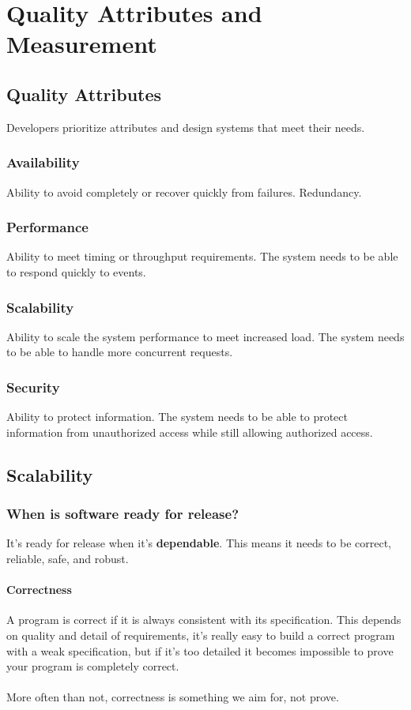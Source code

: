 \chapter{Quality Attributes and Measurement}
\section{Quality Attributes}
Developers prioritize attributes and design systems that meet their needs.\\
\subsection{Availability}
Ability to avoid completely or recover quickly from failures. Redundancy.
\subsection{Performance}
Ability to meet timing or throughput requirements. The system needs to be able to respond quickly to events.
\subsection{Scalability}
Ability to scale the system performance to meet increased load. The system needs to be able to handle more concurrent requests.
\subsection{Security}
Ability to protect information. The system needs to be able to protect information from unauthorized access while still allowing authorized access.

\section{Scalability}
\subsection{When is software ready for release?}
It's ready for release when it's \textbf{dependable}. This means it needs to be correct, reliable, safe, and robust.
\subsubsection{Correctness}
A program is correct if it is always consistent with its specification. This depends on quality and detail of requirements, it's really easy to build a correct program with a weak specification, but if it's too detailed it becomes impossible to prove your program is completely correct.\\
\\
More often than not, correctness is something we aim for, not prove.
